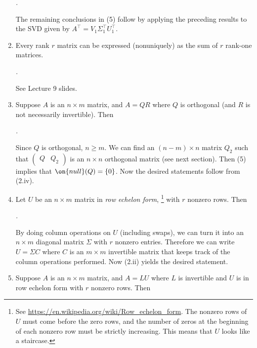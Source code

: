 \documentclass[10pt]{amsart}
\makeatletter
\renewenvironment{proof}[1][\proofname]{\par
	\pushQED{\qed}%
	\normalfont \topsep6\p@\@plus6\p@\relax
	\noindent\emph{#1.} 
	\ignorespaces
}{%
\popQED\endtrivlist\@endpefalse
}
\theoremstyle{mythm}
\theoremstyle{definition}
\theoremstyle{myrmk}
\newenvironment{myproof}{\color{blue}\begin{proof}}{\end{proof}}
\makeatother
\begin{document}
\begin{enumerate}[label=(\arabic*)]
\begin{myproof}
			The remaining conclusions in (5) follow by applying the preceding results to the SVD given by $A^\top = V_1 \Sigma_1^\top U_1^\top$. 
		\end{myproof}
		\item Every rank $r$ matrix can be expressed (nonuniquely) as the sum of $r$ rank-one matrices. 
		\begin{myproof}
			See Lecture 9 slides. 
		\end{myproof}
		\item Suppose $A$ is an $n \times m$ matrix, and $A = QR$ where $Q$ is orthogonal (and $R$ is not necessarily invertible). Then 
		\begin{myproof}
			Since $Q$ is orthogonal, $n \ge m$. We can find an $(n-m) \times n$ matrix $Q_2$ such that $\left( \begin{array}{c|c} Q & Q_2 \end{array} \right)$ is an $n \times n$ orthogonal matrix (see next section). Then (5) implies that $\on{null}(Q) = \{0\}$. Now the desired statements follow from (2.iv). 
		\end{myproof}
		\item Let $U$ be an $n \times m$ matrix in \emph{row echelon form}, \footnote{See \url{https://en.wikipedia.org/wiki/Row_echelon_form}. The nonzero rows of $U$ must come before the zero rows, and the number of zeros at the beginning of each nonzero row must be strictly increasing. This means that $U$ looks like a staircase.} with $r$ nonzero rows. Then 
		\begin{myproof}
			By doing column operations on $U$ (including swaps), we can turn it into an $n \times m$ diagonal matrix $\Sigma$ with $r$ nonzero entries. Therefore we can write $U = \Sigma C$ where $C$ is an $m \times m$ invertible matrix that keeps track of the column operations performed. Now (2.ii) yields the desired statement. 
		\end{myproof}
		\item Suppose $A$ is an $n \times m$ matrix, and $A = LU$ where $L$ is invertible and $U$ is in row echelon form with $r$ nonzero rows. Then 
\end{enumerate}
\end{document}
